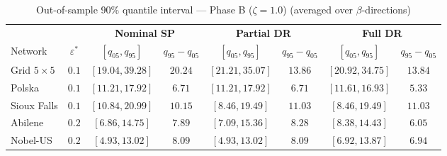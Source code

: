 \begin{table}[htbp]
\centering
\caption{Out-of-sample 90\% quantile interval — Phase B ($\zeta=1.0$) (averaged over $\beta$-directions)}
\label{tab:oos-zeta10}
\small
\setlength{\tabcolsep}{6pt}
\begin{tabular}{l c cc cc cc}
\toprule
& & \multicolumn{2}{c}{\textbf{Nominal SP}} & \multicolumn{2}{c}{\textbf{Partial DR}} & \multicolumn{2}{c}{\textbf{Full DR}} \\
\cmidrule(lr){3-4} \cmidrule(lr){5-6} \cmidrule(lr){7-8}
Network & $\varepsilon^{*}$ & $[q_{05}, q_{95}]$ & $q_{95} \!-\! q_{05}$ & $[q_{05}, q_{95}]$ & $q_{95} \!-\! q_{05}$ & $[q_{05}, q_{95}]$ & $q_{95} \!-\! q_{05}$ \\
\midrule
Grid $5 \times 5$ & $0.1$ & $[19.04, 39.28]$ & $20.24$ & $[21.21, 35.07]$ & $13.86$ & $[20.92, \mathbf{34.75}]$ & $\mathbf{13.84}$ \\
Polska & $0.1$ & $[11.21, 17.92]$ & $6.71$ & $[11.21, 17.92]$ & $6.71$ & $[11.61, \mathbf{16.93}]$ & $\mathbf{5.33}$ \\
Sioux Falls & $0.1$ & $[10.84, 20.99]$ & $\mathbf{10.15}$ & $[8.46, \mathbf{19.49}]$ & $11.03$ & $[8.46, \mathbf{19.49}]$ & $11.03$ \\
Abilene & $0.2$ & $[6.86, 14.75]$ & $7.89$ & $[7.09, 15.36]$ & $8.28$ & $[8.38, \mathbf{14.43}]$ & $\mathbf{6.05}$ \\
Nobel-US & $0.2$ & $[4.93, \mathbf{13.02}]$ & $8.09$ & $[4.93, \mathbf{13.02}]$ & $8.09$ & $[6.92, 13.87]$ & $\mathbf{6.94}$ \\
\bottomrule
\end{tabular}
\end{table}



